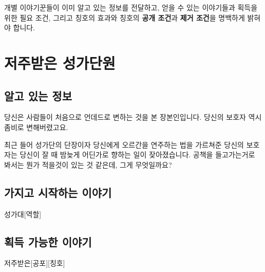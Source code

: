 \documentclass{report}
\begin{document}
	개별 이야기꾼들이 이미 알고 있는 정보를 전달하고, 얻을 수 있는 이야기들과 획득을 위한 필요 조건, 그리고 칭호의 효과와 칭호의 \textbf{공개 조건}과 \textbf{제거 조건}을 명백하게 밝혀야 합니다.
	
	
	
	
	
	\pagebreak \hypertarget{cursed-bard}{}
	\section{저주받은 성가단원}
		\subsection*{알고 있는 정보}
			당신은 사람들이 처음으로 언데드로 변하는 것을 본 장본인입니다. 당신의 보호자 역시 좀비로 변해버렸고요.
			
			최근 들어 성가단의 단장이자 당신에게 오르간을 연주하는 법을 가르쳐준 당신의 보호자는 당신이 잘 때 밤늦게 어딘가로 향하는 일이 잦아졌습니다. 공책을 들고가는거로 봐서는 뭔가 적을것이 있는 것 같은데, 그게 무엇일까요?
			
		\subsection*{가지고 시작하는 이야기}
			\begin{spoiler}{성가대}{[역할]}
				
				
			\end{spoiler}
		
		\subsection*{획득 가능한 이야기}
			\begin{spoiler}{저주받은}{[공포][칭호]}
				
				
			\end{spoiler}
			
\end{document}
